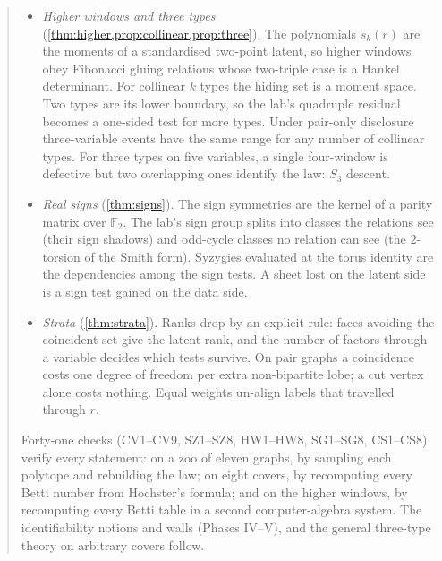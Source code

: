 \documentclass[11pt]{article}
\theoremstyle{definition}\newtheorem{definition}[theorem]{Definition}\newtheorem{remark}[theorem]{Remark}\newtheorem{example}[theorem]{Example}
\begin{document}
\begin{abstract}
\begin{itemize}
  test. Relations are disconnected fibres and syzygies are hollow loops (Hochster's formula). The syzygies are exactly the dependencies
  among the tests, so a test of all relations has $\operatorname{codim}$ degrees of freedom. On the bowtie the ideal is Hilbert--Burch:
  three witnesses of one latent ratio. A coincidence on a shared variable disables the tests that pass through it.
\item \emph{Higher windows and three types} (\cref{thm:higher,prop:collinear,prop:three}). The polynomials $s_k(r)$ are the moments
  of a standardised two-point latent, so higher windows obey Fibonacci gluing relations whose two-triple case is a Hankel determinant.
  For collinear $k$ types the hiding set is a moment space. Two types are its lower boundary, so the lab's quadruple residual becomes a
  one-sided test for more types. Under pair-only disclosure three-variable events have the same range for any number of collinear
  types. For three types on five variables, a single four-window is defective but two overlapping ones identify the law: $S_3$ descent.
\item \emph{Real signs} (\cref{thm:signs}). The sign symmetries are the kernel of a parity matrix over $\mathbb F_2$. The lab's sign group
  splits into classes the relations see (their sign shadows) and odd-cycle classes no relation can see (the $2$-torsion of the Smith
  form). Syzygies evaluated at the torus identity are the dependencies among the sign tests. A sheet lost on the latent side is a sign
  test gained on the data side.
\item \emph{Strata} (\cref{thm:strata}). Ranks drop by an explicit rule: faces avoiding the coincident set give the latent rank, and the
  number of factors through a variable decides which tests survive. On pair graphs a coincidence costs one degree of freedom per extra
  non-bipartite lobe; a cut vertex alone costs nothing. Equal weights un-align labels that travelled through $r$.
\end{itemize}
Forty-one checks (CV1--CV9, SZ1--SZ8, HW1--HW8, SG1--SG8, CS1--CS8) verify every statement: on a zoo of eleven graphs, by sampling each polytope and rebuilding the
law; on eight covers, by recomputing every Betti number from Hochster's formula; and on the higher windows, by recomputing every
Betti table in a second computer-algebra system. The identifiability notions and walls (Phases IV--V), and the general three-type theory on arbitrary covers follow.
\end{abstract}
\end{document}
